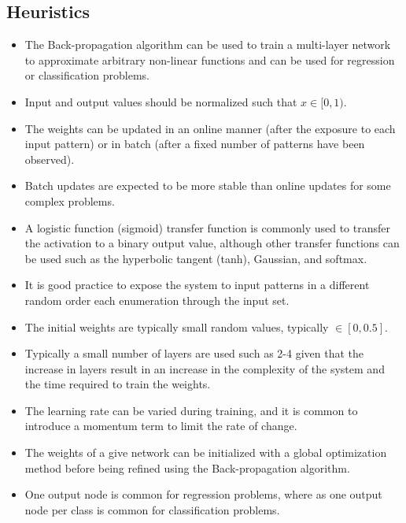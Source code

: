\subsection{Heuristics}
\begin{itemize}
	\item The Back-propagation algorithm can be used to train a multi-layer network to approximate arbitrary non-linear functions and can be used for regression or classification problems.
	\item Input and output values should be normalized such that $x \in [0,1)$.
	\item The weights can be updated in an online manner (after the exposure to each input pattern) or in batch (after a fixed number of patterns have been observed).
	\item Batch updates are expected to be more stable than online updates for some complex problems.
	\item A logistic function (sigmoid) transfer function is commonly used to transfer the activation to a binary output value, although other transfer functions can be used such as the hyperbolic tangent (tanh), Gaussian, and softmax.
	\item It is good practice to expose the system to input patterns in a different random order each enumeration through the input set.
	\item The initial weights are typically small random values, typically $\in [0, 0.5]$.
	\item Typically a small number of layers are used such as 2-4 given that the increase in layers result in an increase in the complexity of the system and the time required to train the weights.
	\item The learning rate can be varied during training, and it is common to introduce a momentum term to limit the rate of change.
	\item The weights of a give network can be initialized with a global optimization method before being refined using the Back-propagation algorithm.
	\item One output node is common for regression problems, where as one output node per class is common for classification problems.
\end{itemize}

